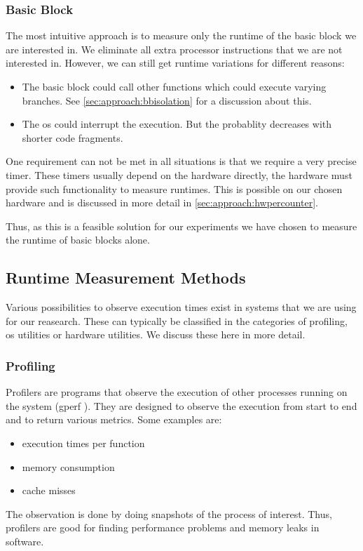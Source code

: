 \subsubsection{Basic Block}
\tobechecked
The most intuitive approach is to measure only the runtime of the basic block we are interested in.
We eliminate all extra processor instructions that we are not interested in.
However, we can still get runtime variations for different reasons:
\begin{itemize}
    \item The basic block could call other functions which could execute varying branches. 
          See \cref{sec:approach:bbisolation} for a discussion about this.
    \item The \ac{os} could interrupt the execution. 
          But the probablity decreases with shorter code fragments.
\end{itemize}

One requirement can not be met in all situations is that we require a very precise timer.
These timers usually depend on the hardware directly, \ie the hardware must provide such functionality to measure runtimes.
This is possible on our chosen hardware and is discussed in more detail in \cref{sec:approach:hwpercounter}.

Thus, as this is a feasible solution for our experiments we have chosen to measure the runtime of basic blocks alone.
    
\subsection{Runtime Measurement Methods}
\tobechecked
\label{sec:approach:datageneration:runtime_methods}
Various possibilities to observe execution times exist in systems that we are using for our reasearch.
These can typically be classified in the categories of profiling, \ac{os} utilities or hardware utilities.
We discuss these here in more detail.

\subsubsection{Profiling}
\tobechecked
Profilers are programs that observe the execution of other processes running on the system (\eg gperf \cite{graham1982gprof}).
They are designed to observe the execution from start to end and to return various metrics. Some examples are:
\begin{itemize}
    \item execution times per function
    \item memory consumption
    \item cache misses
\end{itemize}
The observation is done by doing snapshots of the process of interest.
Thus, profilers are good for finding \eg performance problems and memory leaks in software.

